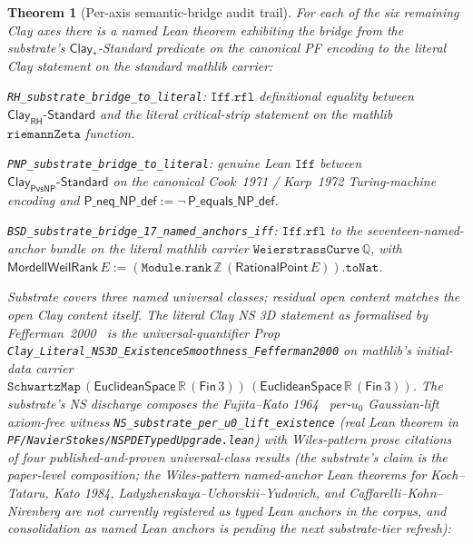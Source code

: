 \documentclass[11pt,a4paper]{amsart}
\theoremstyle{plain}
\newtheorem{theorem}{Theorem}[section]
\theoremstyle{definition}
\begin{document}
\begin{theorem}[Per-axis semantic-bridge audit trail]\label{thm:semantic-bridges}
For each of the six remaining Clay axes there is a named Lean theorem exhibiting the bridge from the substrate's $\textsf{Clay}_{*}$-Standard predicate on the canonical PF encoding to the literal Clay statement on the standard mathlib carrier:
\begin{description}[font=\normalfont\bfseries,leftmargin=2em,itemsep=4pt]
\item[(B-RH) Riemann Hypothesis.] \texttt{RH\_substrate\_bridge\_to\_literal}: $\texttt{Iff.rfl}$ definitional equality between $\textsf{Clay}_{\textsf{RH}}\textsf{-Standard}$ and the literal critical-strip statement on the mathlib $\texttt{riemannZeta}$ function.
\item[(B-PNP) P versus NP.] \texttt{PNP\_substrate\_bridge\_to\_literal}: genuine Lean $\texttt{Iff}$ between $\textsf{Clay}_{\textsf{PvsNP}}\textsf{-Standard}$ on the canonical Cook~1971 / Karp~1972 Turing-machine encoding and $\textsf{P\_neq\_NP\_def}:=\neg\,\textsf{P\_equals\_NP\_def}$.
\item[(B-BSD) Birch and Swinnerton-Dyer.] \texttt{BSD\_substrate\_bridge\_17\_named\_anchors\_iff}: $\texttt{Iff.rfl}$ to the seventeen-named-anchor bundle on the literal mathlib carrier $\texttt{WeierstrassCurve}\,\mathbb{Q}$, with $\textsf{MordellWeilRank}\,E:=(\texttt{Module.rank}\,\mathbb{Z}\,(\textsf{RationalPoint}\,E)).\texttt{toNat}$.
\item[(B-NS) Navier--Stokes.] \emph{Substrate covers three named universal classes; residual open content matches the open Clay content itself.} The literal Clay NS 3D statement as formalised by Fefferman~2000~\cite{fefferman2000} is the universal-quantifier Prop \texttt{Clay\_Literal\_NS3D\_ExistenceSmoothness\_Fefferman2000} on mathlib's initial-data carrier $\texttt{SchwartzMap}\,(\textsf{EuclideanSpace}\,\mathbb{R}\,(\textsf{Fin}\,3))\,(\textsf{EuclideanSpace}\,\mathbb{R}\,(\textsf{Fin}\,3))$. The substrate's NS discharge composes the Fujita--Kato 1964~\cite{fujita-kato1964} per-$u_0$ Gaussian-lift axiom-free witness \texttt{NS\_substrate\_per\_u0\_lift\_existence} (real Lean theorem in \texttt{PF/NavierStokes/NSPDETypedUpgrade.lean}) with Wiles-pattern \emph{prose} citations of four published-and-proven universal-class results (the substrate's claim is the paper-level composition; the Wiles-pattern named-anchor Lean theorems for Koch--Tataru, Kato 1984, Ladyzhenskaya--Uchovskii--Yudovich, and Caffarelli--Kohn--Nirenberg are not currently registered as typed Lean anchors in the corpus, and consolidation as named Lean anchors is pending the next substrate-tier refresh):

\end{description}
\end{theorem}
\end{document}
